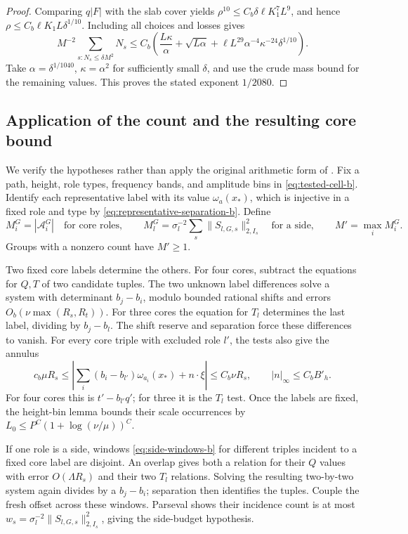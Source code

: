 \begin{proof}
Comparing \(q|F|\) with the slab cover yields
\(\rho^{10}\le C_b\delta\ell K_1^7L^9\), and hence
\(\rho\le C_b\ell K_1L\delta^{1/10}\).
Including all choices and losses gives
\[
 M^{-2}\sum_{s:N_s\le\delta M^2}N_s
 \le C_b\left(\frac{L\kappa}{\alpha}
       +\sqrt{L\alpha}
       +\ell L^{29}\alpha^{-4}\kappa^{-24}\delta^{1/10}\right).
\]
Take \(\alpha=\delta^{1/1040}\), \(\kappa=\alpha^2\) for
sufficiently small \(\delta\), and use the crude mass bound for
the remaining values.  This proves the stated exponent \(1/2080\).
\end{proof}

\subsection{Application of the count and the resulting core bound}

We verify the hypotheses rather than apply the original arithmetic
form of \cite[Proposition~9.2]{H}.  Fix a path, height, role types,
frequency bands, and amplitude bins in \eqref{eq:tested-cell-b}.
Identify each representative label with its value
\(\omega_a(x_*)\), which is injective in a fixed role and type by
\eqref{eq:representative-separation-b}.  Define
\[
 M_i^G=|\mathcal A_i^G|\quad\text{for core roles},\qquad
 M_l^G=\sigma_l^{-2}\sum_s\|S_{l,G,s}\|_{2,I_s}^2
          \quad\text{for a side},\qquad M'=\max_iM_i^G.
\]
Groups with a nonzero count have \(M'\ge1\).

Two fixed core labels determine the others.  For four cores,
subtract the equations for \(Q,T\) of two candidate tuples.
The two unknown label differences solve a system with determinant
\(b_j-b_i\), modulo bounded rational shifts and errors
\(O_b(\nu\max(R_s,R_t))\).  For three cores the equation for
\(T_l\) determines the last label, dividing by \(b_j-b_l\).
The shift reserve and separation force these differences to vanish.
For every core triple with excluded role \(l'\), the tests also
give the annulus
\begin{equation}\label{eq:annulus-application-b}
 c_b\mu R_s\le
 \left|\sum_i(b_i-b_{l'})\omega_{a_i}(x_*)+n\cdot\xi\right|
 \le C_b\nu R_s,\qquad |n|_\infty\le C_bB'_h.
\end{equation}
For four cores this is \(t'-b_{l'}q'\); for three it is the
\(T_l\) test.  Once the labels are fixed, the height-bin lemma
\cite[Lemma~3.5]{H} bounds their scale occurrences by
\(L_0\le P^C(1+\log(\nu/\mu))^C\).

If one role is a side, windows \eqref{eq:side-windows-b} for
different triples incident to a fixed core label are disjoint.
An overlap gives both a relation for their \(Q\) values with
error \(O(\Lambda R_s)\) and their two \(T_l\) relations.
Solving the resulting two-by-two system again divides by a
\(b_j-b_i\); separation then identifies the tuples.  Couple the
fresh offset across these windows.  Parseval shows their incidence
count is at most
\(w_s=\sigma_l^{-2}\|S_{l,G,s}\|_{2,I_s}^2\), giving the
side-budget hypothesis.

